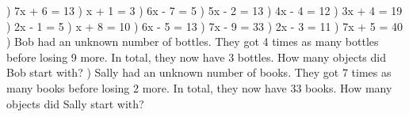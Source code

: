 \documentclass{article}%
\begin{document}
) 7x + 6 = 13%
\newline%
\newline%
) x + 1 = 3%
\newline%
\newline%
) 6x - 7 = 5%
\newline%
\newline%
) 5x - 2 = 13%
\newline%
\newline%
) 4x - 4 = 12%
\newline%
\newline%
) 3x + 4 = 19%
\newline%
\newline%
) 2x - 1 = 5%
\newline%
\newline%
) x + 8 = 10%
\newline%
\newline%
) 6x - 5 = 13%
\newline%
\newline%
) 7x - 9 = 33%
\newline%
\newline%
) 2x - 3 = 11%
\newline%
\newline%
) 7x + 5 = 40%
\newline%
\newline%
) Bob had an unknown number of bottles. They got 4 times as many bottles before losing 9 more. In total, they now have 3 bottles. How many objects did Bob start with?%
\newline%
\newline%
) Sally had an unknown number of books. They got 7 times as many books before losing 2 more. In total, they now have 33 books. How many objects did Sally start with?%
\newline%
\newline%
\end{document}
